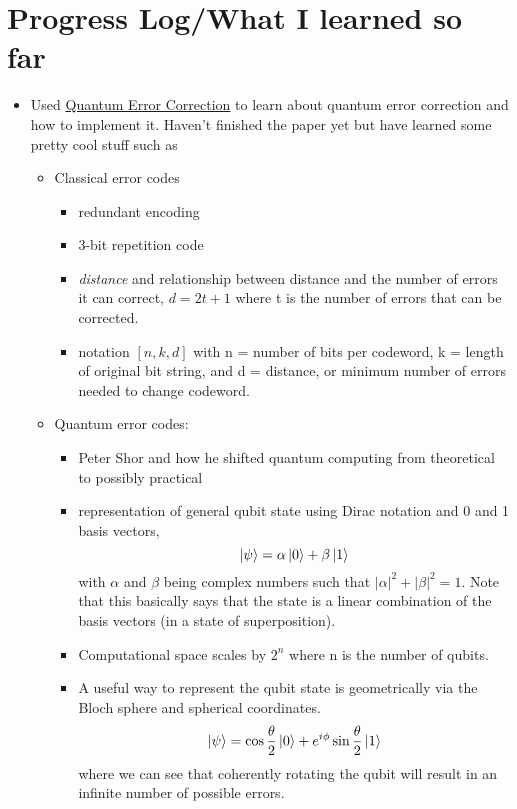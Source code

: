 \documentclass{article}
\begin{document}
\section*{Progress Log/What I learned so far}
\begin{itemize}
    \item Used \href{https://arxiv.org/pdf/1907.11157}{Quantum Error Correction} to learn about quantum error correction and how to implement it. Haven't finished the paper yet but have learned some pretty cool stuff such as 
    \begin{itemize}
        \item Classical error codes
        \begin{itemize} 
            \item redundant encoding 
            \item 3-bit repetition code
            \item\textit{distance} and relationship between distance and the number of errors it can correct, $d = 2t + 1$ where t is the number of errors that can be corrected.
            \item notation $[n, k, d]$ with n = number of bits per codeword, k = length of original bit string, and d = distance, or minimum number of errors needed to change codeword. 
        \end{itemize}
        \item Quantum error codes: 
        \begin{itemize}
            \item Peter Shor and how he shifted quantum computing from theoretical to possibly practical
            \item representation of general qubit state using Dirac notation and 0 and 1 basis vectors, $$\left| \psi \right> = \alpha \left| 0 \right> + \beta \left| 1 \right>$$  with $\alpha$ and $\beta$ being complex numbers such that $|\alpha|^2 + |\beta|^2 = 1$. Note that this basically says that the state is a linear combination of the basis vectors (in a state of superposition).
            \item Computational space scales by $2^n$ where n is the number of qubits.
            \item A useful way to represent the qubit state is geometrically via the Bloch sphere and spherical coordinates. $$\left| \psi \right> = \cos{\frac \theta 2}\left| 0 \right> + e^{i\phi}\sin{\frac \theta 2}\left| 1 \right>$$
            where we can see that coherently rotating the qubit will result in an infinite number of possible errors. 


\end{itemize}
\end{itemize}
\end{itemize}
\end{document}
